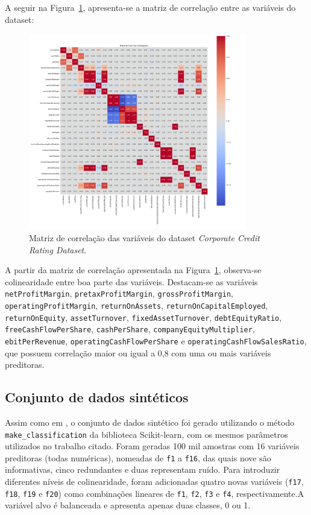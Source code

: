 A seguir na Figura~\ref{fig:matriz_correlacao_corporate_credit_rating}, apresenta-se a matriz de correlação entre as variáveis do dataset:

\begin{figure}[H]
    \centering
    \includegraphics[width=0.85\textwidth]{figs/Correlacoes_Corporate_Credit_Rating.png}
    \caption{Matriz de correlação das variáveis do dataset \textit{Corporate Credit Rating Dataset}.}
    \label{fig:matriz_correlacao_corporate_credit_rating}
\end{figure}

A partir da matriz de correlação apresentada na Figura~\ref{fig:matriz_correlacao_corporate_credit_rating}, observa-se colinearidade entre boa parte das variáveis. Destacam-se as variáveis \texttt{netProfitMargin}, \texttt{pretaxProfitMargin}, \texttt{grossProfitMargin}, \texttt{operatingProfitMargin}, \texttt{returnOnAssets}, \texttt{returnOnCapitalEmployed}, \texttt{returnOnEquity}, \texttt{assetTurnover}, \texttt{fixedAssetTurnover}, \texttt{debtEquityRatio}, \texttt{freeCashFlowPerShare}, \texttt{cashPerShare}, \texttt{companyEquityMultiplier}, \texttt{ebitPerRevenue}, \texttt{operatingCashFlowPerShare} e \texttt{operatingCashFlowSalesRatio}, que possuem correlação maior ou igual a 0,8 com uma ou mais variáveis preditoras.



\subsection{Conjunto de dados sintéticos}
Assim como em , o conjunto de dados sintético foi gerado utilizando o método \texttt{make\_classification} da biblioteca Scikit-learn, com os mesmos parâmetros utilizados no trabalho citado. Foram geradas 100 mil amostras com 16 variáveis preditoras (todas numéricas), nomeadas de \texttt{f1} a \texttt{f16}, das quais nove são informativas, cinco redundantes e duas representam ruído. Para introduzir diferentes níveis de colinearidade, foram adicionadas quatro novas variáveis (\texttt{f17}, \texttt{f18}, \texttt{f19} e \texttt{f20}) como combinações lineares de \texttt{f1}, \texttt{f2}, \texttt{f3} e \texttt{f4}, respectivamente.A variável alvo é balanceada e apresenta apenas duas classes, 0 ou 1.

